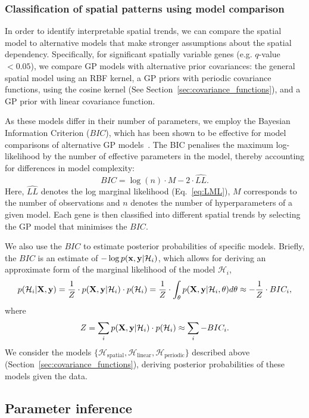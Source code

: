 \subsubsection*{Classification of spatial patterns using model comparison}

In order to identify interpretable spatial trends, we can compare the spatial model to alternative models that make stronger assumptions about the spatial dependency. 
Specifically, for significant spatially variable genes (e.g. \( q \)-value \( < 0.05 \)), we compare GP models with alternative prior covariances: the general spatial model using an RBF kernel, a GP priors with periodic covariance functions, using the cosine kernel (See Section~\ref{sec:covariance_functions}), and a GP prior with linear covariance function.

As these models differ in their number of parameters, we employ the Bayesian Information Criterion (\( BIC \)), which has been shown to be effective for model comparisons of alternative GP models~\cite{Lloyd2014-ky}. The BIC penalises the maximum log-likelihood by the number of effective parameters in the model, thereby accounting for differences in model complexity:
\[
BIC = \log (n) \cdot M - 2 \cdot \hat{LL}.
\]
Here, \( \hat{LL} \) denotes the log marginal likelihood (Eq.~\ref{eq:LML}), $ M $ corresponds to the number of observations and $n$ denotes the number of hyperparameters of a given model. Each gene is then classified into different spatial trends by selecting the GP model that minimises the \( BIC \).

We also use the \( BIC \) to estimate posterior probabilities of specific models. Briefly, the \( BIC \) is an estimate of \( -\log p( {\bf x}, {\bf y} | \mathcal{H}_i ) \), which allows for deriving an approximate form of the marginal likelihood of the model \( \mathcal{H}_i \),
\[
p( \mathcal{H}_i | {\bf X}, {\bf y}) = \frac{1}{Z} \cdot p({\bf X}, {\bf y} | \mathcal{H}_i) \cdot p( \mathcal{H}_i ) = \frac{1}{Z} \cdot \int_{\theta} p( {\bf X}, {\bf y} | \mathcal{H}_i, \theta ) d \theta \approx -\frac{1}{Z} \cdot BIC_i, 
\]
where
\[
Z = \sum_i p({\bf X}, {\bf y} | \mathcal{H}_i) \cdot p( \mathcal{H}_i ) \approx \sum_i -BIC_i.
\]
We consider the models \( \{ \mathcal{H}_{\text{spatial}}, \mathcal{H}_{\text{linear}}, \mathcal{H}_{\text{periodic}} \} \) described above (Section~\ref{sec:covariance_functions}), deriving posterior probabilities of these models given the data.


\subsection{Parameter inference}
\label{sec:param_inference}

